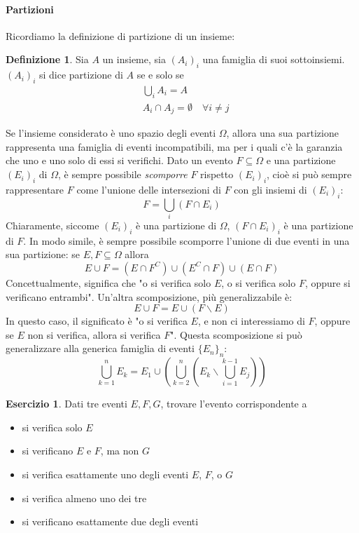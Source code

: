 \documentclass{article}
\theoremstyle{plain}
\theoremstyle{definition}
\newtheorem{definizione}{Definizione}[section]
\newtheorem{esercizio}{Esercizio}[section]
\theoremstyle{remark}
\begin{document}
\paragraph{Partizioni} %
\label{par:partizioni}
Ricordiamo la definizione di partizione di un insieme:
\begin{definizione}
	Sia $A$ un insieme, sia $(A_i)_i$ una famiglia di suoi sottoinsiemi. $(A_i)_i$ si dice partizione di $A$ se e solo se
	\begin{align*}
		&\bigcup_i A_i =A\\
		&A_i\cap A_j =\emptyset \quad\forall i\neq j
	\end{align*}
\end{definizione}
Se l'insieme considerato è uno spazio degli eventi $\Omega$, allora una sua partizione rappresenta una famiglia di eventi incompatibili, ma per i quali c'è la garanzia che uno e uno solo di essi si verifichi. Dato un evento $F\subseteq\Omega$ e una partizione $(E_i)_i$ di $\Omega$, è sempre possibile \textit{scomporre} $F$ rispetto $(E_i)_i$, cioè si può sempre rappresentare $F$ come l'unione delle intersezioni di $F$ con gli insiemi di $(E_i)_i$:
\begin{equation*}
	F=\bigcup_i (F\cap E_i)
\end{equation*}
Chiaramente, siccome $(E_i)_i$ è una partizione di $\Omega$, $(F\cap E_i)_i$ è una partizione di $F$. In modo simile, è sempre possibile scomporre l'unione di due eventi in una sua partizione: se $E,F\subseteq\Omega$ allora
\begin{equation*}
	E\cup F=(E\cap F^C)\cup(E^C\cap F)\cup (E\cap F)
\end{equation*}
Concettualmente, significa che "o si verifica solo $E$, o si verifica solo $F$, oppure si verificano entrambi". Un'altra scomposizione, più generalizzabile è:
\begin{equation*}
	E\cup F=E\cup(F\smallsetminus E)
\end{equation*}
In questo caso, il significato è "o si verifica $E$, e non ci interessiamo di $F$, oppure se $E$ non si verifica, allora si verifica $F$". Questa scomposizione si può generalizzare alla generica famiglia di eventi $\{E_n\}_n$:
\begin{equation*}%
	\bigcup_{k=1}^n E_k=E_1 \cup\left(\bigcup_{k=2}^n \left(E_k\smallsetminus\bigcup_{i=1}^{k-1} E_j\right)\right)
\end{equation*}
\begin{esercizio}
	Dati tre eventi $E,F,G$, trovare l'evento corrispondente a
	\begin{itemize}
		\item si verifica solo $E$
		\item si verificano $E$ e $F$, ma non $G$
		\item si verifica esattamente uno degli eventi $E$, $F$, o $G$
		\item si verifica almeno uno dei tre
		\item si verificano esattamente due degli eventi
	\end{itemize}
\end{esercizio}
\end{document}
